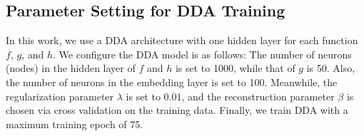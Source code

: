 
\subsection{Parameter Setting for DDA Training}
\label{sec:setting}

In this work, we use a DDA architecture with one hidden layer for each function $f$, $g$, and $h$. We configure the DDA model is as follows: The number of neurons (nodes) in the hidden layer of $f$ and $h$ is set to 1000, while that of $g$ is 50. Also, the number of neurons in the embedding layer is set to 100. Meanwhile, the regularization parameter $\lambda$ is set to $0.01$, and the reconstruction parameter $\beta$ is chosen via cross validation on the training data. Finally, we train DDA with a maximum training epoch of 75.



